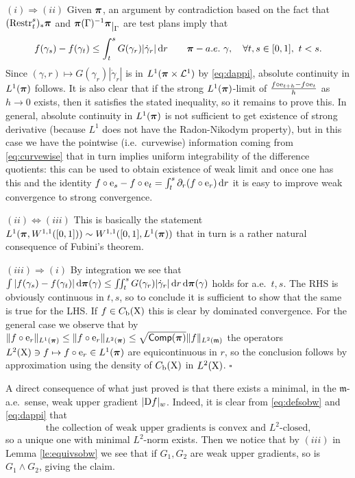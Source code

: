 \documentclass[11pt]{article}
\numberwithin{equation}{section}
\newenvironment{idea}{\removelastskip\par\medskip   %
\noindent{\em Idea of the proof} \rm}{\penalty-20\null\hfill$\square$\par\medbreak}
\newcommand{\ppi}{{\mbox{\boldmath$\pi$}}}
\newcommand{\sppi}{{\mbox{\scriptsize\boldmath$\pi$}}}
\newcommand{\restr}[1]{\lower3pt\hbox{$|_{#1}$}}
\newcommand{\e}{{\rm e}}
\newcommand{\Restr}[2]{{\rm Restr}_{#1}^{#2}}
\newcommand{\X}{{\rm X}}
\newcommand{\mm}{{\mathfrak m}}
\renewcommand{\d}{{\rm d}}
\newcommand{\D}{{\rm D}}
\renewcommand{\b}{{\rm b}}
\newcommand{\comp}{{\sf Comp}} %
\begin{document}
\begin{idea}$(i)\Rightarrow(ii)$ Given $\ppi$, an argument by contradiction based on the fact that   $(\Restr ts)_*\ppi$ and $\ppi(\Gamma)^{-1}\ppi\restr\Gamma$ are  test plans imply that
\begin{equation}
\label{eq:curvewise}
 f(\gamma_s)-f(\gamma_t)\leq \int_t^sG(\gamma_r)|\dot\gamma_r|\,\d r\qquad\ppi-a.e.\ \gamma,\quad\forall t,s\in[0,1],\ t<s.
\end{equation}
Since $(\gamma,r)\mapsto G(\gamma_r)|\dot\gamma_r|$ is in $L^1(\ppi\times\mathcal L^1)$ by \eqref{eq:dappi}, absolute continuity in $L^1(\ppi)$ follows. It is also clear that if the strong $L^1(\ppi)$-limit of $\frac{f\circ\e_{t+h}-f\circ\e_t}{h}$ as $h\to0$ exists, then it satisfies the stated inequality, so it remains to prove this. In general, absolute continuity in $L^1(\ppi)$ is not sufficient to get existence of strong derivative (because $L^1$ does not have the Radon-Nikodym property), but in this case we have the pointwise (i.e.\ curvewise) information coming from \eqref{eq:curvewise} that in turn implies uniform integrability of the difference quotients: this can be used to obtain existence of weak limit and once one has this and the identity $f\circ\e_s-f\circ\e_t=\int_t^s\partial_r(f\circ\e_r)\,\d r$ it is easy to improve weak convergence to strong convergence.

$(ii)\Leftrightarrow(iii)$ This is basically  the  statement $L^1(\ppi,W^{1,1}([0,1]))\sim W^{1,1}([0,1],L^1(\ppi))$ that in turn is a rather natural consequence of Fubini's theorem. 

$(iii)\Rightarrow(i)$ By integration we see that  $\int|f(\gamma_s)-f(\gamma_t)|\,\d\ppi(\gamma)\leq \iint_t^sG(\gamma_r)|\dot\gamma_r|\,\d r\,\d\ppi(\gamma)$ holds for a.e.\ $t,s$. The RHS is obviously continuous in $t,s$, so to conclude it is sufficient to show that the same is true for the LHS. If $f\in C_\b(\X)$ this is clear by dominated convergence. For the general case we observe that by $\|f\circ\e_r\|_{L^1(\sppi)}\leq\|f\circ\e_r\|_{L^2(\sppi)}\leq \sqrt{\comp(\ppi) }\|f\|_{L^2(\mm)}$
the operators $L^2(\X)\ni f\mapsto f\circ\e_r\in L^1(\ppi)$ are equicontinuous in $r$, so the conclusion follows by approximation using the density of $C_\b(\X)$ in $L^2(\X)$.
\end{idea}
A direct consequence of what just proved is that there exists a minimal, in the $\mm$-a.e.\ sense, weak upper gradient $|\D f|_w$. Indeed, it is clear from \eqref{eq:defsobw} and \eqref{eq:dappi} that 
\begin{equation}
\label{eq:wclosed}
\text{the collection of weak upper gradients is convex and $L^2$-closed,}
\end{equation}
so a unique one with minimal $L^2$-norm exists. Then we notice that by $(iii)$ in Lemma \ref{le:equivsobw} we see that if $G_1,G_2$ are weak upper gradients, so is $G_1\wedge G_2$, giving the claim.
\end{document}
